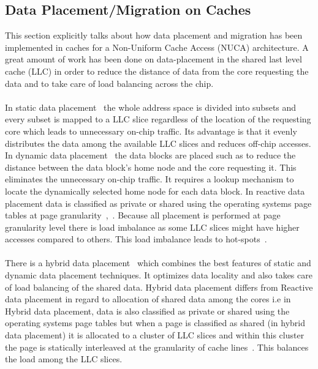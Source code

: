\documentclass{listhesis}
\begin{document}
\subsection{Data Placement/Migration on Caches}
This section explicitly talks about how data placement and migration has been implemented in caches for a Non-Uniform Cache Access (NUCA) architecture. A great amount of work has been done on data-placement in the shared last level cache (LLC) in order to reduce the distance of data from the core requesting the data and to take care of load balancing across the chip.\\
\\
In static data placement~\cite{cacheDataPlacement1, cacheDataPlacement2} the whole address space is divided into subsets and every subset is mapped to a LLC slice regardless of the location of the requesting core which leads to unnecessary on-chip traffic. Its advantage is that it evenly distributes the data among the available LLC slices and reduces off-chip accesses. In dynamic data placement~\cite{cacheDataPlacement1, cacheDataPlacement3, cacheDataPlacement4} the data blocks are placed such as to reduce the distance between the data block's home node and the core requesting it. This eliminates the unnecessary on-chip traffic. It requires a lookup mechanism to locate the dynamically selected home node for each data block. In reactive data placement data is classified as private or shared using the operating systems page tables at page granularity~\cite{cacheDataPlacement4},~\cite{cacheDataPlacement6}. Because all placement is performed at page granularity level there is load imbalance as some LLC slices might have higher accesses compared to others. This load imbalance leads to hot-spots~\cite{cacheDataPlacement6}.\\
\\
There is a hybrid data placement~\cite{cacheDataPlacement6} which combines the best features of static and dynamic data placement techniques. It optimizes data locality and also takes care of load balancing of the shared data. Hybrid data placement differs from Reactive data placement in regard to allocation of shared data among the cores i.e in Hybrid data placement, data is also classified as private or shared using the operating systems page tables but when a page is classified as shared (in hybrid data placement) it is allocated to a cluster of LLC slices and within this cluster the page is statically interleaved at the granularity of cache lines~\cite{cacheDataPlacement6}. This balances the load among the LLC slices.\\
\end{document}
